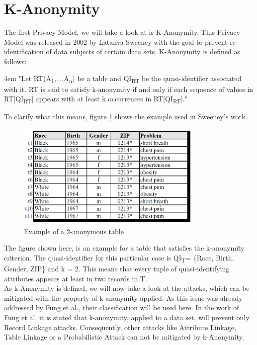 \documentclass[12pt, a4paper,oneside]{report}
\begin{document}
\section{K-Anonymity} \label{k-an}
The first Privacy Model, we will take a look at is K-Anonymity. This Privacy Model was released in 2002 by Latanya Sweeney with the goal to prevent re-identification of data subjects of certain data sets\cite{SWEENEY2002}. K-Anonymity is defined as follows:\\
\par
\begingroup
\leftskip4em
\rightskip\leftskip
"Let RT(A\textsubscript{1},...,A\textsubscript{n}) be a table and QI\textsubscript{RT} be the quasi-identifier associated with it. RT is said to satisfy k-anonymity if and only if each sequence of values in
RT[QI\textsubscript{RT}] appears with at least k occurrences in RT[QI\textsubscript{RT}]."\cite{SWEENEY2002}\\
\par
\endgroup
To clarify what this means, figure \ref{fig:2} shows the example used in Sweeney's work\cite{SWEENEY2002}.  
\begin{figure}[h]
	\centering
	\includegraphics[width=0.8\textwidth]{k-anonymity-example}
	\caption{Example of a 2-anonymous table \cite{SWEENEY2002}}
	\label{fig:2}
\end{figure}
The figure shown here, is an example for a table that satisfies the k-anonymity criterion. The quasi-identifier for this particular case is QI\textsubscript{T}= \{Race, Birth, Gender, ZIP\} and k = 2. This means that every tuple of quasi-identifying attributes appears at least in two records in T.\\
As k-Anonymity is defined, we will now take a look at the attacks, which can be mitigated with the property of k-anonymity applied. As this issue was already addressed by Fung et al., their classification will be used here. In the work of Fung et al. it is stated that k-anonymity, applied to a data set, will prevent only Record Linkage attacks. Consequently, other attacks like Attribute Linkage, Table Linkage or a Probabilistic Attack can not be mitigated by k-Anonymity\cite{Fung2010}.
\end{document}
